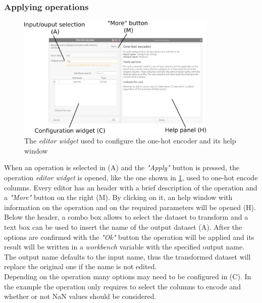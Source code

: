 \subsubsection{Applying operations}
\begin{figure}
	\centering
	\includegraphics[width=0.85\textwidth]{editor-widget}
	\caption{The \textit{editor widget} used to configure the one-hot encoder and its help window}
	\label{fig:editor-widget-single-man}
\end{figure}
When an operation is selected in (A) and the \textit{"Apply"} button is pressed, the operation \textit{editor widget} is opened, like the one shown in \cref{fig:editor-widget-single-man}, used to one-hot encode columns. Every editor has an header with a brief description of the operation and a \textit{"More"} button on the right (M). By clicking on it, an help window with information on the operation and on the required parameters will be opened (H).\\
Below the header, a combo box allows to select the dataset to transform and a text box can be used to insert the name of the output dataset (A). After the options are confirmed with the \textit{"Ok"} button the operation will be applied and its result will be written in a \textit{workbench} variable with the specified output name. The output name defaults to the input name, thus the transformed dataset will replace the original one if the name is not edited.\\ Depending on the operation many options may need to be configured in (C). In the example the operation only requires to select the columns to encode and whether or not NaN values should be considered.\\

